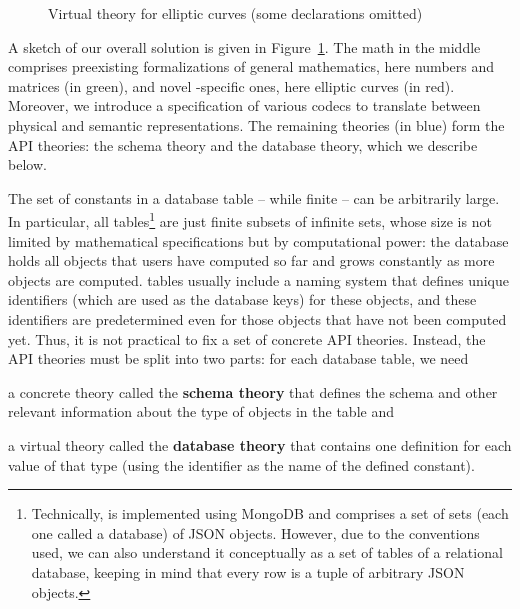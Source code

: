 \begin{figure}[ht]
{
    }
    \endgroup
  \caption[Virtual Theory Architecture]{
    Virtual theory for \lmfdb elliptic curves (some declarations omitted) 
  }
  \label{fig:vtarch}
\end{figure}
A sketch of our overall solution is given in Figure~\ref{fig:vtarch}.
The math in the middle comprises preexisting formalizations of general mathematics, here numbers and matrices (in green), and novel \lmfdb-specific ones, here elliptic curves (in red).
Moreover, we introduce a specification of various codecs to translate between physical and semantic representations.
The remaining theories (in blue) form the \lmfdb API theories: the schema theory and the database theory, which we describe below.

The set of constants in a database table -- while finite -- can be arbitrarily large.
In particular, all \lmfdb tables\footnote{Technically, \lmfdb is implemented using MongoDB and comprises a set of sets (each one called a database) of JSON objects. 
However, due to the conventions used, we can also understand it conceptually as a set of tables of a relational database, keeping in mind that every row is a tuple of arbitrary JSON objects.}
are just finite subsets of infinite sets, whose size is not limited by mathematical specifications but by computational power: the database holds all objects that users have computed so far and grows constantly as more objects are computed.
\lmfdb tables usually include a naming system that defines unique identifiers (which are used as the database keys) for these objects, and these identifiers are predetermined even for those objects that have not been computed yet.
Thus, it is not practical to fix a set of concrete API theories.
Instead, the API theories must be split into two parts: for each database table, we need
\begin{compactitem}
  \item a concrete theory called the \textbf{schema theory} that defines the schema  and other relevant information about the type of objects in the table and
  \item a virtual theory called the \textbf{database theory} that contains one definition for each value of that type (using the \lmfdb identifier as the name of the defined constant). 
\end{compactitem}

